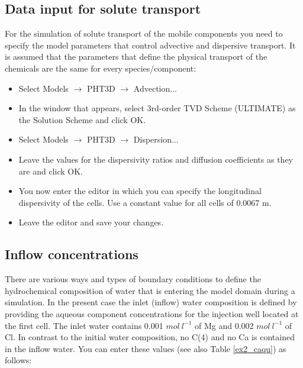 \subsection[Data input for solute transport]{Data input for solute transport}

For the simulation of solute transport of the mobile components you need to specify the model parameters that control advective and dispersive transport. It is assumed that the parameters that define the physical transport of the chemicals are the same for every species/component:

\begin{itemize}

\item Select Models $\rightarrow$ PHT3D $\rightarrow$ Advection...

\item In the window that appears, select 3rd-order TVD Scheme (ULTIMATE) as the Solution Scheme and click OK.

\item Select Models $\rightarrow$ PHT3D $\rightarrow$ Dispersion...

\item Leave the values for the dispersivity ratios and diffusion coefficients as they are and click OK.

\item You now enter the editor in which you can specify the longitudinal dispersivity of the cells. Use a constant value for all cells of 0.0067 m.

\item Leave the editor and save your changes.

\end{itemize}

\subsection[Inflow concentrations]{Inflow concentrations}

There are various ways and types of boundary conditions to define the hydrochemical
composition of water that is entering the model domain during a simulation.
In the present case the inlet (inflow) water composition is defined by providing the 
aqueous component concentrations for the injection well located at the first cell. The inlet water contains 0.001 $mol\ l^{-1}$ of Mg and 0.002 $mol\ l^{-1}$ of Cl. In contrast to the initial water composition, no C(4) and no Ca is contained
in the inflow water. You can enter these values (see also Table \ref{ex2_caqu}) as follows:

